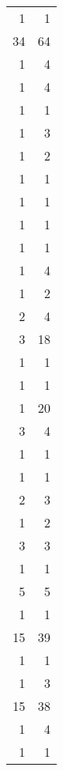 \begin{tabular}{rr}
                  1 &             1 \\
                 34 &            64 \\
                  1 &             4 \\
                  1 &             4 \\
                  1 &             1 \\
                  1 &             3 \\
                  1 &             2 \\
                  1 &             1 \\
                  1 &             1 \\
                  1 &             1 \\
                  1 &             1 \\
                  1 &             4 \\
                  1 &             2 \\
                  2 &             4 \\
                  3 &            18 \\
                  1 &             1 \\
                  1 &             1 \\
                  1 &            20 \\
                  3 &             4 \\
                  1 &             1 \\
                  1 &             1 \\
                  2 &             3 \\
                  1 &             2 \\
                  3 &             3 \\
                  1 &             1 \\
                  5 &             5 \\
                  1 &             1 \\
                 15 &            39 \\
                  1 &             1 \\
                  1 &             3 \\
                 15 &            38 \\
                  1 &             4 \\
                  1 &             1 \\

\end{tabular}
